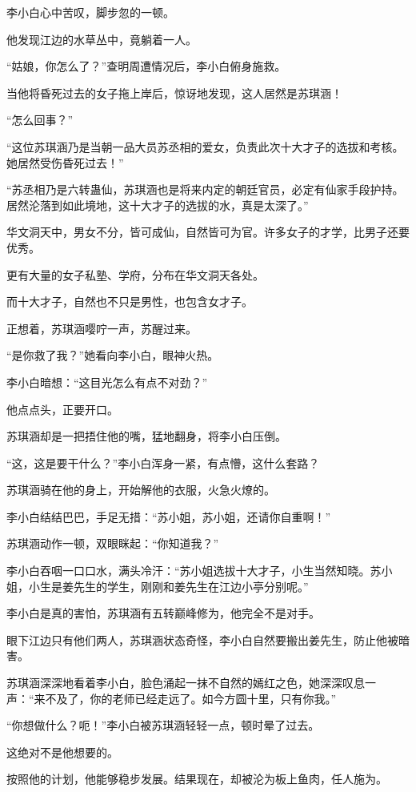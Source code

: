\begin{this_body}
李小白心中苦叹，脚步忽的一顿。

他发现江边的水草丛中，竟躺着一人。

“姑娘，你怎么了？”查明周遭情况后，李小白俯身施救。

当他将昏死过去的女子拖上岸后，惊讶地发现，这人居然是苏琪涵！

“怎么回事？”

“这位苏琪涵乃是当朝一品大员苏丞相的爱女，负责此次十大才子的选拔和考核。她居然受伤昏死过去！”

“苏丞相乃是六转蛊仙，苏琪涵也是将来内定的朝廷官员，必定有仙家手段护持。居然沦落到如此境地，这十大才子的选拔的水，真是太深了。”

华文洞天中，男女不分，皆可成仙，自然皆可为官。许多女子的才学，比男子还要优秀。

更有大量的女子私塾、学府，分布在华文洞天各处。

而十大才子，自然也不只是男性，也包含女才子。

正想着，苏琪涵嘤咛一声，苏醒过来。

“是你救了我？”她看向李小白，眼神火热。

李小白暗想：“这目光怎么有点不对劲？”

他点点头，正要开口。

苏琪涵却是一把捂住他的嘴，猛地翻身，将李小白压倒。

“这，这是要干什么？”李小白浑身一紧，有点懵，这什么套路？

苏琪涵骑在他的身上，开始解他的衣服，火急火燎的。

李小白结结巴巴，手足无措：“苏小姐，苏小姐，还请你自重啊！”

苏琪涵动作一顿，双眼眯起：“你知道我？”

李小白吞咽一口口水，满头冷汗：“苏小姐选拔十大才子，小生当然知晓。苏小姐，小生是姜先生的学生，刚刚和姜先生在江边小亭分别呢。”

李小白是真的害怕，苏琪涵有五转巅峰修为，他完全不是对手。

眼下江边只有他们两人，苏琪涵状态奇怪，李小白自然要搬出姜先生，防止他被暗害。

苏琪涵深深地看着李小白，脸色涌起一抹不自然的嫣红之色，她深深叹息一声：“来不及了，你的老师已经走远了。如今方圆十里，只有你我。”

“你想做什么？呃！”李小白被苏琪涵轻轻一点，顿时晕了过去。

这绝对不是他想要的。

按照他的计划，他能够稳步发展。结果现在，却被沦为板上鱼肉，任人施为。


\end{this_body}
